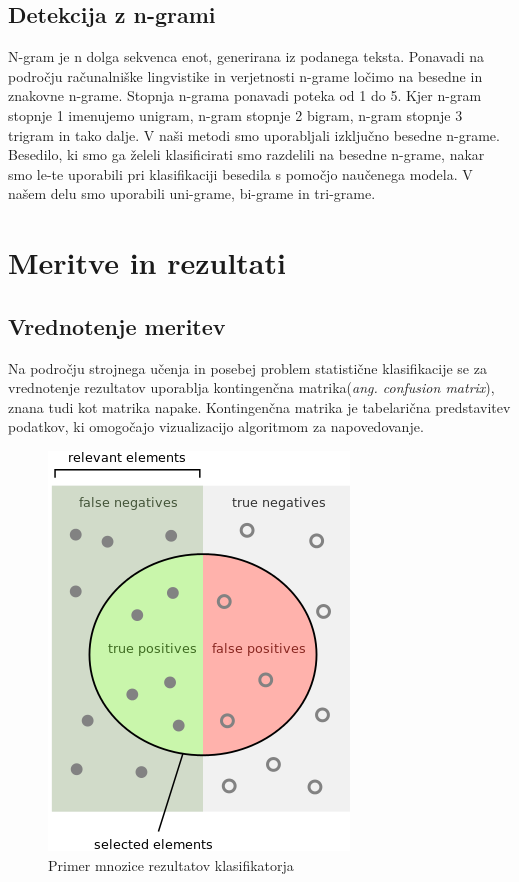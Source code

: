 \documentclass{acm_proc_article-sp}
\begin{document}
\subsection{Detekcija z n-grami}
N-gram je n dolga sekvenca enot, generirana iz podanega teksta.
Ponavadi na področju računalniške lingvistike in verjetnosti n-grame ločimo na besedne in znakovne n-grame. 
Stopnja n-grama ponavadi poteka od 1 do 5. 
Kjer n-gram stopnje 1 imenujemo unigram, n-gram stopnje 2 bigram, n-gram stopnje 3 trigram in tako dalje. 
V naši metodi smo uporabljali izključno besedne n-grame. 
Besedilo, ki smo ga želeli klasificirati smo razdelili na besedne n-grame, nakar smo le-te uporabili pri klasifikaciji besedila s pomočjo naučenega modela.
V našem delu smo uporabili uni-grame, bi-grame in tri-grame.

\section{Meritve in rezultati}
\subsection{Vrednotenje meritev}
Na področju strojnega učenja in posebej problem statistične klasifikacije se za vrednotenje rezultatov uporablja kontingenčna matrika({\it ang. confusion matrix}), znana tudi kot matrika napake.
Kontingenčna matrika je tabelarična predstavitev podatkov, ki omogočajo vizualizacijo algoritmom za napovedovanje.

\begin{figure}[!h]
	\centering
	\caption{Primer mnozice rezultatov klasifikatorja} \label{mnozicaZadetkov}
	\includegraphics[scale=0.45]{Precisionrecall}
\end{figure}
\end{document}

